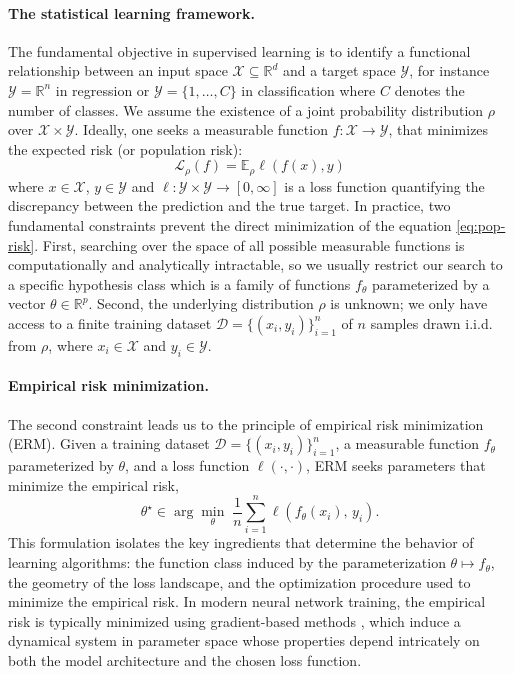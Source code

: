 \paragraph{The statistical learning framework.}
The fundamental objective in supervised learning is to identify a functional
relationship between an input space $\mathcal{X} \subseteq \mathbb{R}^{d}$ and
a target space $\mathcal{Y}$, for instance \(\mathcal Y=\mathbb R^n\) in
regression or \(\mathcal Y=\{1,\dots,C\}\) in classification where $C$ denotes
the number of classes. We
assume the existence of a joint probability distribution $\rho$ over
$\mathcal{X} \times \mathcal{Y}$. Ideally, one seeks a measurable function $f:
	\mathcal{X} \to \mathcal{Y}$, that minimizes the expected risk (or population
risk):
\begin{equation}
	\mathcal{L}_{\rho}(f) = \mathbb{E}_{\rho}\ell(f(x),y)
	\label{eq:pop-risk}
\end{equation}
where $x \in \mathcal X$, $y \in \mathcal Y$ and $\ell: \mathcal{Y} \times \mathcal{Y} \to [0, \infty]$ is a loss function quantifying
the discrepancy between the prediction and the true target.
\citep{vapnik1999overview, shalev2014understanding}
In practice, two fundamental constraints prevent the direct minimization of the
equation \eqref{eq:pop-risk}. First, searching over the space of all possible
measurable functions is computationally and analytically intractable, so we
usually restrict our search to a specific hypothesis class which is a family of
functions $f_\theta$ parameterized by a vector $\theta \in \mathbb{R}^p$. Second, the
underlying distribution $\rho$ is unknown; we only have access to a finite
training dataset $\mathcal{D} = \{(x_i, y_i)\}_{i=1}^n$ of $n$ samples drawn
i.i.d. from $\rho$, where \(x_i \in \mathcal X\) and \(y_i \in \mathcal Y\).

\paragraph{Empirical risk minimization.}
The second constraint leads us to the principle of
empirical risk minimization (ERM). Given a training dataset $\mathcal{D} = \{(x_i,
	y_i)\}_{i=1}^n$, a measurable function $f_\theta$ parameterized by $\theta$, and a loss function
$\ell(\cdot,\cdot)$, ERM seeks parameters that minimize the empirical risk,
\begin{equation}
	\theta^\star \in
	\arg\min_{\theta} \; \frac{1}{n} \sum_{i=1}^n \ell\!\left(f_\theta(x_i),\,
	y_i\right).
\end{equation}
This formulation isolates the key ingredients that determine the behavior of
learning algorithms: the function class induced by the parameterization $\theta
	\mapsto f_\theta$, the geometry of the loss landscape, and the optimization
procedure used to minimize the empirical risk. In modern neural network
training, the empirical risk is typically minimized using gradient-based
methods \citep{bottou2018optimization}, which induce a dynamical system in
parameter space whose properties depend intricately on both the model
architecture and the chosen loss function.

